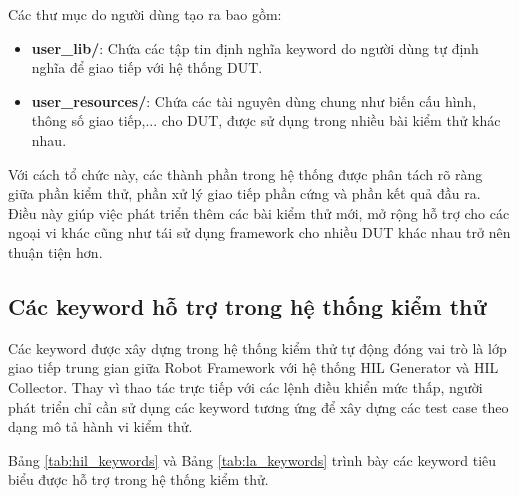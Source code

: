 Các thư mục do người dùng tạo ra bao gồm:

\begin{itemize}
    \item \textbf{user\_lib/}: Chứa các tập tin định nghĩa keyword do người dùng tự định nghĩa để giao tiếp với hệ thống DUT.
    \item \textbf{user\_resources/}: Chứa các tài nguyên dùng chung như biến cấu hình, thông số giao tiếp,... cho DUT, được sử dụng trong nhiều bài kiểm thử khác nhau.

\end{itemize}

Với cách tổ chức này, các thành phần trong hệ thống được phân tách rõ ràng giữa phần kiểm thử, phần xử lý giao tiếp phần cứng và phần kết quả đầu ra. Điều này giúp việc phát triển thêm các bài kiểm thử mới, mở rộng hỗ trợ cho các ngoại vi khác cũng như tái sử dụng framework cho nhiều DUT khác nhau trở nên thuận tiện hơn.

\subsection{Các keyword hỗ trợ trong hệ thống kiểm thử}

Các keyword được xây dựng trong hệ thống kiểm thử tự động đóng vai trò là lớp giao tiếp trung gian giữa Robot Framework với hệ thống HIL Generator và HIL Collector. Thay vì thao tác trực tiếp với các lệnh điều khiển mức thấp, người phát triển chỉ cần sử dụng các keyword tương ứng để xây dựng các test case theo dạng mô tả hành vi kiểm thử.

Bảng \ref{tab:hil_keywords} và Bảng \ref{tab:la_keywords} trình bày các keyword tiêu biểu được hỗ trợ trong hệ thống kiểm thử.
\renewcommand{\arraystretch}{1.3}
\renewcommand{\arraystretch}{1.3}

